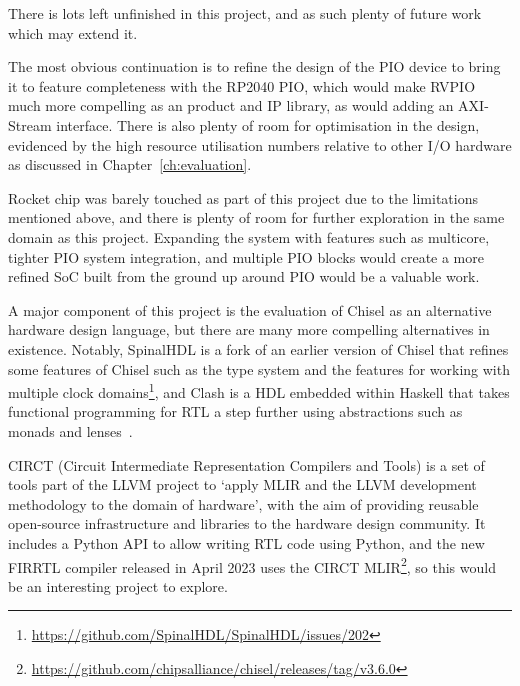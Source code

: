 There is lots left unfinished in this project, and as such plenty of future work which may extend it.

The most obvious continuation is to refine the design of the PIO device to bring it to feature completeness with the RP2040 PIO, which would make RVPIO much more compelling as an product and IP library, as would adding an AXI-Stream interface. There is also plenty of room for optimisation in the design, evidenced by the high resource utilisation numbers relative to other I/O hardware as discussed in Chapter~\ref{ch:evaluation}.

Rocket chip was barely touched as part of this project due to the limitations mentioned above, and there is plenty of room for further exploration in the same domain as this project. Expanding the system with features such as multicore, tighter PIO system integration, and multiple PIO blocks would create a more refined SoC built from the ground up around PIO would be a valuable work.

A major component of this project is the evaluation of Chisel as an alternative hardware design language, but there are many more compelling alternatives in existence. Notably, SpinalHDL is a fork of an earlier version of Chisel that refines some features of Chisel such as the type system and the features for working with multiple clock domains\footnote{\url{https://github.com/SpinalHDL/SpinalHDL/issues/202}}, and Clash is a HDL embedded within Haskell that takes functional programming for RTL a step further using abstractions such as monads and lenses~\cite{clash}.

CIRCT (Circuit Intermediate Representation Compilers and Tools) is a set of tools part of the LLVM project to `apply MLIR and the LLVM development methodology to the domain of hardware', with the aim of providing reusable open-source infrastructure and libraries to the hardware design community. It includes a Python API to allow writing RTL code using Python, and the new FIRRTL compiler released in April 2023 uses the CIRCT MLIR\footnote{\url{https://github.com/chipsalliance/chisel/releases/tag/v3.6.0}}, so this would be an interesting project to explore.
